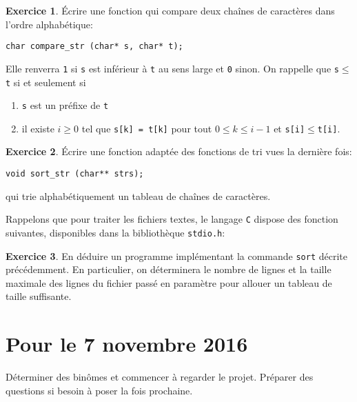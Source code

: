 \documentclass[french,a4paper]{article}
\theoremstyle{definition}
\newtheorem{exercise}{Exercice}
\theoremstyle{remark}
\newcommand{\shell}[1]{\lstinline[style={},style=sh]|#1|}
\newcommand{\inlinec}[1]{\lstinline[style=C]°#1°}
\begin{document}
\begin{exercise}
  \'Ecrire une fonction qui compare deux chaînes de caractères dans
  l'ordre alphabétique:
  \begin{lstlisting}
char compare_str (char* s, char* t);
  \end{lstlisting}
  Elle renverra \inlinec{1} si \inlinec{s} est inférieur à \inlinec{t}
  au sens large et \inlinec{0} sinon. On rappelle que
  \inlinec{s}${}\leq{}$\inlinec{t} si et seulement si
  \begin{enumerate}[label=-]
  \item \inlinec{s} est un préfixe de \inlinec{t}
  \item il existe $i\geq 0$ tel que \inlinec{s[k] = t[k]} pour tout
    $0\leq k\leq i-1$ et \inlinec{s[i]}${}\leq{}$\inlinec{t[i]}.
\end{enumerate}

\end{exercise}

\begin{exercise}
  \'Ecrire une fonction adaptée des fonctions de tri vues la dernière fois:
  \begin{lstlisting}
void sort_str (char** strs);
  \end{lstlisting}
  qui trie alphabétiquement un tableau de chaînes de caractères.
\end{exercise}

Rappelons que pour traiter les fichiers textes, le langage {\tt C}
dispose des fonction suivantes, disponibles dans la bibliothèque
\inlinec{stdio.h}: 

\begin{exercise}
  En déduire un programme implémentant la commande \shell{sort}
  décrite précédemment. En particulier, on déterminera le nombre de
  lignes et la taille maximale des lignes du fichier passé en
  paramètre pour allouer un tableau de taille suffisante.
\end{exercise}

\section{Pour le 7 novembre 2016}
\label{sec:homeworks}

Déterminer des binômes et commencer à regarder le projet. Préparer des
questions si besoin à poser la fois prochaine.
\end{document}

